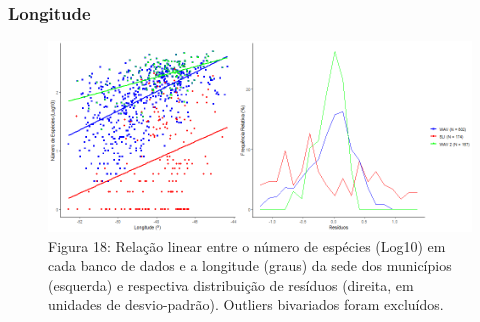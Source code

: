 \subsubsection{Longitude}

\begin{figure}[h!]
\centering
\includegraphics[width = 15cm]{Imagens/32533.png}
\\{\scriptsize Figura 18: Relação linear entre o número de espécies (Log10) em cada banco de dados e a longitude (graus) da sede dos municípios (esquerda) e respectiva distribuição de resíduos (direita, em unidades de desvio-padrão). Outliers bivariados foram excluídos.}
\end{figure}

\texto
